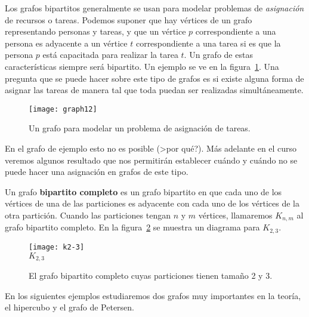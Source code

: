 \begin{ejemplo}
Los grafos bipartitos generalmente se usan para modelar problemas de \emph{asignación} de recursos o tareas.
Podemos suponer que hay vértices de un grafo representando personas y tareas, y que un vértice $p$ correspondiente a una persona es adyacente a un vértice $t$ correspondiente a una tarea si es que la persona $p$ está capacitada para realizar la tarea $t$.
Un grafo de estas características siempre será bipartito.
Un ejemplo se ve en la figura~\ref{fig:job-ass}.
Una pregunta que se puede hacer sobre este tipo de grafos es si existe alguna forma de asignar las tareas de manera tal que toda puedan ser realizadas simultáneamente.
\begin{figure}[h!]
\centering
\texttt{[image: graph12]}
\caption{Un grafo para modelar un problema de asignación de tareas.}
\label{fig:job-ass}
\end{figure} 
En el grafo de ejemplo esto no es posible (>por qué?).
Más adelante en el curso veremos algunos resultado que nos permitirán establecer cuándo y cuándo no se puede hacer una asignación en grafos de este tipo.
\end{ejemplo}

\begin{definicion}
Un grafo {\bf bipartito completo} es un grafo bipartito en que cada uno de los vértices de una de las particiones es adyacente con cada uno de los vértices de la otra partición.
Cuando las particiones tengan $n$ y $m$ vértices, llamaremos $K_{n,m}$ al grafo bipartito completo.
En la figura~\ref{fig:k2-3} se muestra un diagrama para $K_{2,3}$.
\begin{figure}[h!]
\centering
\texttt{[image: k2-3]}\\
$K_{2,3}$
\caption{El grafo bipartito completo cuyas particiones tienen tamaño 2 y 3.}
\label{fig:k2-3}
\end{figure}
\end{definicion}

En los siguientes ejemplos estudiaremos dos grafos muy importantes en la teoría, el hipercubo y el grafo de Petersen.

